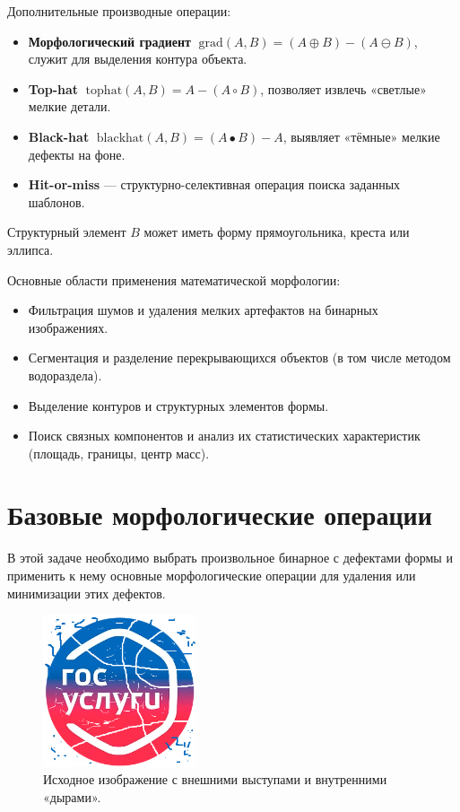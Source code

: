 \documentclass[a4paper,12pt]{article}
\begin{document}
Дополнительные производные операции:
\begin{itemize}
  \item \textbf{Морфологический градиент} 
    \(\;\mathrm{grad}(A,B) = (A \oplus B) - (A \ominus B)\), 
    служит для выделения контура объекта.
  \item \textbf{Top-hat} 
    \(\;\mathrm{tophat}(A,B) = A - (A \circ B)\), 
    позволяет извлечь «светлые» мелкие детали.
  \item \textbf{Black-hat} 
    \(\;\mathrm{blackhat}(A,B) = (A \bullet B) - A\), 
    выявляет «тёмные» мелкие дефекты на фоне.
  \item \textbf{Hit-or-miss} — структурно-селективная операция поиска заданных шаблонов.
\end{itemize}

Структурный элемент \(B\) может иметь форму прямоугольника, креста или эллипса.

Основные области применения математической морфологии:
\begin{itemize}
  \item Фильтрация шумов и удаления мелких артефактов на бинарных изображениях.
  \item Сегментация и разделение перекрывающихся объектов (в том числе методом водораздела).
  \item Выделение контуров и структурных элементов формы.
  \item Поиск связных компонентов и анализ их статистических характеристик (площадь, границы, центр масс).
\end{itemize}

\section{Базовые морфологические операции}
В этой задаче необходимо выбрать произвольное бинарное с дефектами формы и применить к нему основные морфологические операции для удаления или минимизации этих дефектов.

\begin{figure}[H]
    \centering
    \includegraphics[width=0.4\textwidth]{images/gosu2.png}
    \caption{Исходное изображение с внешними выступами и внутренними «дырами».}
\end{figure}
\end{document}
